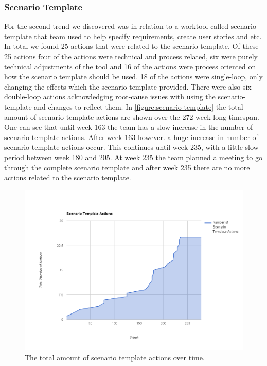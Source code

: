 \subsubsection{Scenario Template}
For the second trend we discovered was in relation to a worktool called scenario template that team used to help specify requirements, create user stories and etc. In total we found 25 actions that were related to the scenario template. Of these 25 actions four of the actions were technical and process related, six were purely technical adjustments of the tool and 16 of the actions were process oriented on how the scenario template should be used. 18 of the actions were single-loop, only changing the effects which the scenario template provided. There were also six double-loop actions acknowledging root-cause issues with using the scenario-template and changes to reflect them. 
In \autoref{figure:scenario-template} the total amount of scenario template actions are shown over the 272 week long timespan. One can see that until week 163 the team has a slow increase in the number of scenario template actions. After week 163 however. a huge increase in number of scenario template actions occur. This continues until week 235, with a little slow period between week 180 and 205. At week 235 the team planned a meeting to go through the complete scenario template and after week 235 there are no more actions related to the scenario template. 

\begin{figure}[!h]
	\centering
	\includegraphics[width=\textwidth, keepaspectratio]{figures/Scenario-tpl.png}
	\caption{The total amount of scenario template actions over time.}
	\label{figure:scenario-template}
\end{figure}


